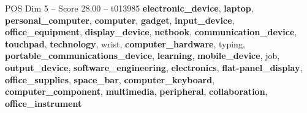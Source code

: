 \begin{textsample}{POS Dim 5 – Score 28.00 – t013985}  \label{ex:f5_pos_025}
\textbf{electronic\_device}, \textbf{laptop}, \textbf{personal\_computer}, \textbf{computer}, \textbf{gadget}, \textbf{input\_device}, \textbf{office\_equipment}, \textbf{display\_device}, \textbf{netbook}, \textbf{communication\_device}, \textbf{touchpad}, \textbf{technology}, wrist, \textbf{computer\_hardware}, typing, \textbf{portable\_communications\_device}, \textbf{learning}, \textbf{mobile\_device}, job, \textbf{output\_device}, \textbf{software\_engineering}, \textbf{electronics}, \textbf{flat-panel\_display}, \textbf{office\_supplies}, \textbf{space\_bar}, \textbf{computer\_keyboard}, \textbf{computer\_component}, \textbf{multimedia}, \textbf{peripheral}, \textbf{collaboration}, \textbf{office\_instrument}

\end{textsample}
